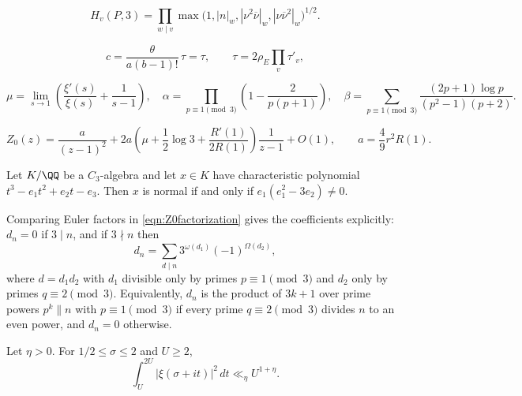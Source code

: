 \begin{equation}\label{eqn:santensLocalHeight} H_v(P,3)=\prod_{w\mid v} \max\bigl(1,|n|_w,|\nu^2\overline\nu|_w, |\nu\overline\nu^2|_w\bigr)^{1/2}. \end{equation}

\begin{equation}\label{eqn:santensTau} c=\frac{\theta}{a(b-1)!}\,\tau=\tau,\qquad \tau=2\rho_E\prod_v\tau'_v, \end{equation}

\begin{equation}\label{eqn:introConstants} \mu=\lim_{s\to1} \left(\frac{\xi'(s)}{\xi(s)}+\frac{1}{s-1}\right), \quad \alpha=\prod_{p\equiv1\pmod3}\left(1-\frac{2}{p(p+1)}\right), \quad \beta=\sum_{p\equiv1\pmod3}\frac{(2p+1)\log p}{(p^2-1)(p+2)}. \end{equation}

\begin{equation}\label{eqn:Z0LaurentR} Z_0(z)=\frac{a}{(z-1)^2} +2a\left(\mu+\frac12\log3+\frac{R'(1)}{2R(1)}\right)\frac{1}{z-1} +O(1), \qquad a=\frac49r^2R(1). \end{equation}

\begin{lemma}\label{lemma:normalityCriterion} Let $K/\QQ$ be a $C_3$-algebra and let $x\in K$ have characteristic polynomial $t^3-e_1t^2+e_2t-e_3$. Then $x$ is normal if and only if $e_1(e_1^2-3e_2)\neq0$. \end{lemma}

\begin{rem}\label{rem:heightCoefficients} Comparing Euler factors in \eqref{eqn:Z0factorization} gives the coefficients explicitly: $d_n=0$ if $3\mid n$, and if $3\nmid n$ then \[ d_n=\sum_{d\mid n}3^{\omega(d_1)}(-1)^{\Omega(d_2)}, \] where $d=d_1d_2$ with $d_1$ divisible only by primes $p\equiv1\pmod3$ and $d_2$ only by primes $q\equiv2\pmod3$. Equivalently, $d_n$ is the product of $3k+1$ over prime powers $p^k\parallel n$ with $p\equiv1\pmod3$ if every prime $q\equiv2\pmod3$ divides $n$ to an even power, and $d_n=0$ otherwise. \end{rem}

\begin{lemma}\label{lemma:xiMeanValue} Let $\eta>0$. For $1/2\leq\sigma\leq2$ and $U\geq2$, \begin{equation}\label{eqn:xiMeanBound} \int_U^{2U}|\xi(\sigma+it)|^2\,dt \ll_\eta U^{1+\eta}. \end{equation} \end{lemma}

